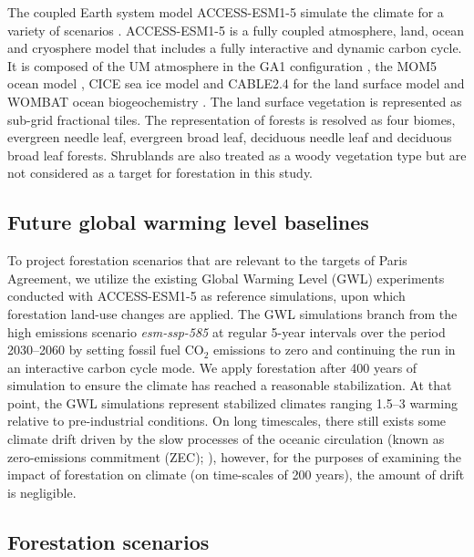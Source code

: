 \documentclass[]{article}
\begin{document}
The coupled Earth system model ACCESS-ESM1-5 simulate the climate for a variety of scenarios \cite{ziehn_australian_2020}.
ACCESS-ESM1-5 is a fully coupled atmosphere, land, ocean and cryosphere model that includes a fully interactive and dynamic carbon cycle.
It is composed of the UM atmosphere in the GA1 configuration \parencite{martin_analysis_2010}, the MOM5 ocean model \parencite{griffies_elements_2012}, CICE sea ice model \parencite{hunke_cice_2008} and CABLE2.4 for the land surface model \parencite{kowalczyk_csiro_2006,wang_global_2010} and WOMBAT ocean biogeochemistry \parencite{law_carbon_2017}.
The land surface vegetation is represented as sub-grid fractional tiles.
The representation of forests is resolved as four biomes, evergreen needle leaf, evergreen broad leaf, deciduous needle leaf and deciduous broad leaf forests.
Shrublands are also treated as a woody vegetation type but are not considered as a target for forestation in this study.

\subsection{Future global warming level baselines}

To project forestation scenarios that are relevant to the targets of Paris Agreement, we utilize the existing Global Warming Level (GWL) experiments conducted with ACCESS-ESM1-5 \parencite{king_studying_2021,king_exploring_2024} as reference simulations, upon which forestation land-use changes are applied.
The GWL simulations branch from the high emissions scenario \textit{esm-ssp-585} \parencite{oneill_scenario_2016, jones_c4mip_2016} at regular 5-year intervals over the period 2030--2060 by setting fossil fuel CO$_2$ emissions to zero and continuing the run in an interactive carbon cycle mode.
We apply forestation after 400 years of simulation to ensure the climate has reached a reasonable stabilization.
At that point, the GWL simulations represent stabilized climates ranging 1.5--3 \textcelsius{} warming relative to pre-industrial conditions.
On long timescales, there still exists some climate drift driven by the slow processes of the oceanic circulation (known as zero-emissions commitment (ZEC); \cite{chamberlain_southern_2023}), however, for the purposes of examining the impact of forestation on climate (on time-scales of 200 years), the amount of drift is negligible.

\subsection{Forestation scenarios}
\end{document}
